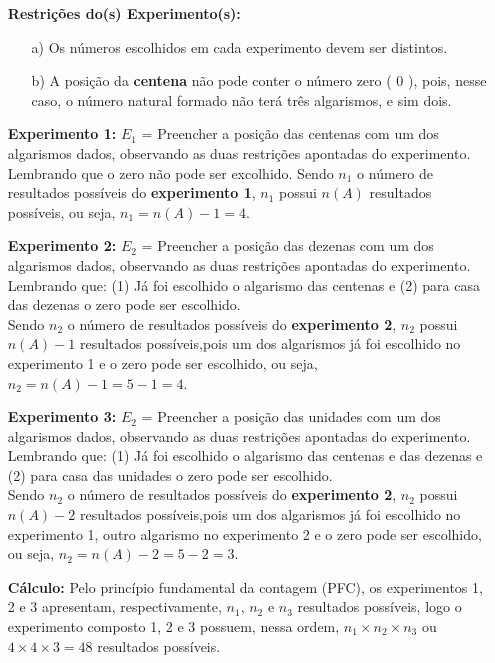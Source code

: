 \documentclass[a4paper,12pt]{article}
\begin{document}
\begin{enumerate}
\begin{itemize}
    \item[\ding{173}] \textbf{Restrições do(s) Experimento(s):}
      \begin{enumerate}
    		\item[a)] Os números escolhidos em cada experimento devem ser distintos.
    		\item[b)] A posição da \textbf{centena} não pode conter o número zero ( 0 ), pois, nesse caso, o número natural formado não terá três algarismos, e sim dois.
      \end{enumerate}
    \item[\ding{174}] \textbf{Experimento 1:} $E_1$ = Preencher a posição das centenas com um dos algarismos dados, observando as duas restrições apontadas do experimento.\\ Lembrando que o zero não pode ser excolhido. Sendo $n_{1}$ o número de resultados possíveis do \textbf{experimento 1}, $n_{1}$ possui $n(A)$ resultados possíveis, ou seja, $n_{1} = n(A)-1 = 4$.
    
    \item[\ding{175}] \textbf{Experimento 2:} $E_2$ = Preencher a posição das dezenas com um dos algarismos dados, observando as duas restrições apontadas do experimento.\\ Lembrando que: (1) Já foi escolhido o algarismo das centenas e (2) para casa das dezenas o zero pode ser escolhido.\\ Sendo $n_{2}$ o número de resultados possíveis do \textbf{experimento 2}, $n_{2}$ possui $n(A)-1$ resultados possíveis,pois um dos algarismos já foi escolhido no experimento 1 e o zero pode ser escolhido, ou seja, $n_{2} = n(A)-1 = 5 - 1 = 4$.
    
    \item[\ding{176}] \textbf{Experimento 3:} $E_2$ = Preencher a posição das unidades com um dos algarismos dados, observando as duas restrições apontadas do experimento.\\ Lembrando que: (1) Já foi escolhido o algarismo das centenas e das dezenas e (2) para casa das unidades o zero pode ser escolhido.\\ Sendo $n_{2}$ o número de resultados possíveis do \textbf{experimento 2}, $n_{2}$ possui $n(A)-2$ resultados possíveis,pois um dos algarismos já foi escolhido no experimento 1, outro algarismo no experimento 2 e o zero pode ser escolhido, ou seja, $n_{2} = n(A)-2 = 5 - 2 = 3$.
      
    \item[\ding{177}] \textbf{Cálculo:} Pelo princípio fundamental da contagem (PFC), os experimentos 1, 2 e 3 apresentam, respectivamente, $n_{1},\, n_{2} \textrm{ e } n_{3}$ resultados possíveis, logo o experimento composto 1, 2 e 3 possuem, nessa ordem, $n_{1} \times n_{2} \times n_{3}$ ou $4 \times 4 \times 3 = 48$ resultados possíveis.
    

\end{itemize}
\end{enumerate}
\end{document}
